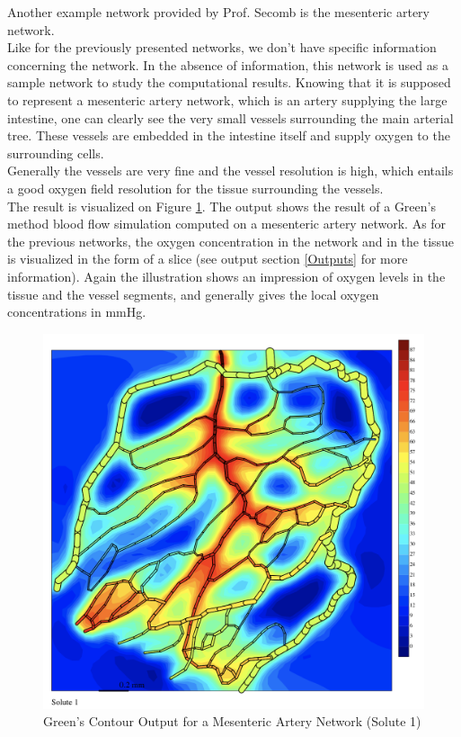 Another example network provided by Prof. Secomb is the mesenteric artery network.
\\Like for the previously presented networks, we don't have specific information concerning the network. In the absence of information, this network is used as a sample network to study the computational results. Knowing that it is supposed to represent a mesenteric artery network, which is an artery supplying the large intestine, one can clearly see the very small vessels surrounding the main arterial tree. These vessels are embedded in the intestine itself and supply oxygen to the surrounding cells.
\\Generally the vessels are very fine and the vessel resolution is high, which entails a good oxygen field resolution for the tissue surrounding the vessels.
\\The result is visualized on Figure \ref{fig:Contour_Mesent1}. The output shows the result of a Green's method blood flow simulation computed on a mesenteric artery network. As for the previous networks, the oxygen concentration in the network and in the tissue is visualized in the form of a slice (see output section \ref{Outputs} for more information). Again the illustration shows an impression of oxygen levels in the tissue and the vessel segments, and generally gives the local oxygen concentrations in mmHg.
\begin{figure}[h]
\centering
\includegraphics[width=120mm]{Contour_Mesent1}
\caption{\footnotesize Green's Contour Output for a Mesenteric Artery Network (Solute 1)}
\label{fig:Contour_Mesent1}
\end{figure}
